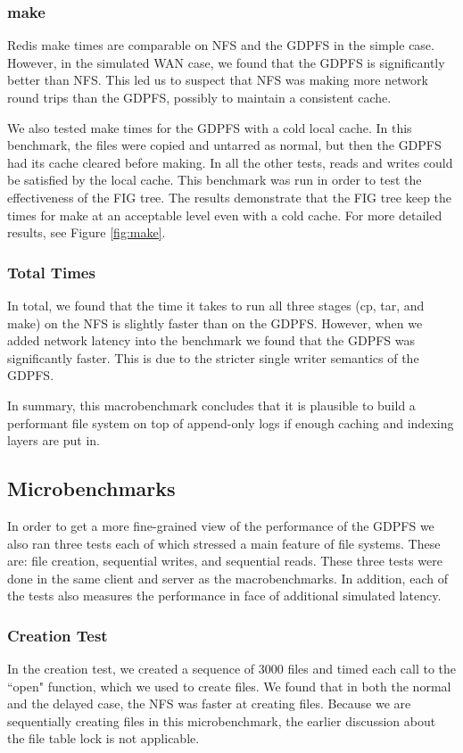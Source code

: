 \documentclass{acm_proc_article-sp}
\begin{document}
\subsubsection{make}
Redis make times are comparable on NFS and the GDPFS in the simple case. However, in the simulated WAN case, we found that the GDPFS is significantly better than NFS. This led us to suspect that NFS was making more network round trips than the GDPFS, possibly to maintain a consistent cache.

We also tested make times for the GDPFS with a cold local cache. In this benchmark, the files were copied and untarred as normal, but then the GDPFS had its cache cleared before making. In all the other tests, reads and writes could be satisfied by the local cache. This benchmark was run in order to test the effectiveness of the FIG tree. The results demonstrate that the FIG tree keep the times for make at an acceptable level even with a cold cache. For more detailed results, see Figure \ref{fig:make}. 

\subsubsection{Total Times}
In total, we found that the time it takes to run all three stages (cp, tar, and make) on the NFS is slightly faster than on the GDPFS. However, when we added network latency into the benchmark we found that the GDPFS was significantly faster. This is due to the stricter single writer semantics of the GDPFS.

In summary, this macrobenchmark concludes that it is plausible to build a performant file system on top of append-only logs if enough caching and indexing layers are put in.

\subsection{Microbenchmarks}\label{sec:microbenchmark}
In order to get a more fine-grained view of the performance of the GDPFS we also ran three tests each of which stressed a main feature of file systems. These are: file creation, sequential writes, and sequential reads. These three tests were done in the same client and server as the macrobenchmarks. In addition, each of the tests also measures the performance in face of additional simulated latency.

\subsubsection{Creation Test}
In the creation test, we created a sequence of 3000 files and timed each call to the ``open" function, which we used to create files. We found that in both the normal and the delayed case, the NFS was faster at creating files. Because we are sequentially creating files in this microbenchmark, the earlier discussion about the file table lock is not applicable. 
\end{document}
